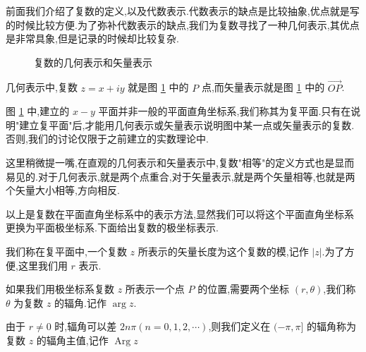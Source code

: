 \documentclass[UTF8]{ctexbook}
\begin{document}
前面我们介绍了复数的定义,以及代数表示.代数表示的缺点是比较抽象,优点就是写的时候比较方便.为了弥补代数表示的缺点,我们为复数寻找了一种几何表示,其优点是非常具象,但是记录的时候却比较复杂.

\begin{figure}[htbp]
    \centering
    \caption{复数的几何表示和矢量表示}
    \label{Fig:复数的几何表示和矢量表示}
\end{figure}

几何表示中,复数 $z=x+iy$ 就是图 \ref{Fig:复数的几何表示和矢量表示} 中的 $P$ 点,而矢量表示就是图 \ref{Fig:复数的几何表示和矢量表示} 中的 $\overrightarrow{OP}$.

图 \ref{Fig:复数的几何表示和矢量表示} 中,建立的 $x-y$ 平面并非一般的平面直角坐标系,我们称其为复平面.只有在说明"建立复平面"后,才能用几何表示或矢量表示说明图中某一点或矢量表示的复数.否则,我们的讨论仅限于之前建立的实数理论中.

这里稍微提一嘴,在直观的几何表示和矢量表示中,复数"相等"的定义方式也是显而易见的.对于几何表示,就是两个点重合,对于矢量表示,就是两个矢量相等,也就是两个矢量大小相等,方向相反.

以上是复数在平面直角坐标系中的表示方法,显然我们可以将这个平面直角坐标系更换为平面极坐标系.下面给出复数的极坐标表示.

\begin{definition}
    我们称在复平面中,一个复数 $z$ 所表示的矢量长度为这个复数的模,记作 $|z|$.为了方便,这里我们用 $r$ 表示.
\end{definition}
\begin{definition}
    如果我们用极坐标系复数 $z$ 所表示一个点 $P$ 的位置,需要两个坐标 $(r,\theta)$,我们称 $\theta$ 为复数 $z$ 的辐角.记作 $\operatorname{arg} z$.
\end{definition}
\begin{definition}
    由于 $r\neq0$ 时,辐角可以差 $2n\pi(n=0,1,2,\cdots)$,则我们定义在 $(-\pi,\pi]$ 的辐角称为复数 $z$ 的辐角主值,记作 $\operatorname{Arg} z$
\end{definition}
\end{document}
